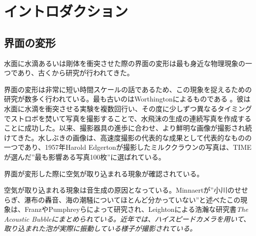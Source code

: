 \documentclass[]{jsarticle}
\begin{document}
\section{イントロダクション}
\subsection{界面の変形}
水面に水滴あるいは剛体を衝突させた際の界面の変形は最も身近な物理現象の一つであり、古くから研究が行われてきた。

界面の変形は非常に短い時間スケールの話であるため、この現象を捉えるための研究が数多く行われている。最も古いのはWorthingtonによるものである \cite{worthington1908}。彼は水面に水滴を衝突させる実験を複数回行い、その度に少しずつ異なるタイミングでストロボを焚いて写真を撮影することで、水飛沫の生成の連続写真を作成することに成功した。以来、撮影器具の進歩に合わせ、より鮮明な画像が撮影され続けてきた。水しぶきの画像は、高速度撮影の代表的な成果として代表的なものの一つであり、1957年Harold Edgertonが撮影したミルククラウンの写真は、TIMEが選んだ”最も影響ある写真100枚”に選ばれている。

界面が変形した際に空気が取り込まれる現象が確認されている。

空気が取り込まれる現象は音生成の原因となっている。Minnaert\cite{minnaert1933xvi}が”小川のせせらぎ、瀑布の轟音、海の潮騒についてほとんど分かっていない”と述べたこの現象は、Franz\cite{Franz1959}やPumphrey\cite{Pumphrey1990}らによって研究され、Leightonによる浩瀚な研究書\it{The Acoustic Bubble}\cite{leightonacoustic}にまとめられている。近年では、ハイスピードカメラを用いて、取り込まれた泡が実際に振動している様子が撮影されている\cite{Phillips2018}。



\end{document}
